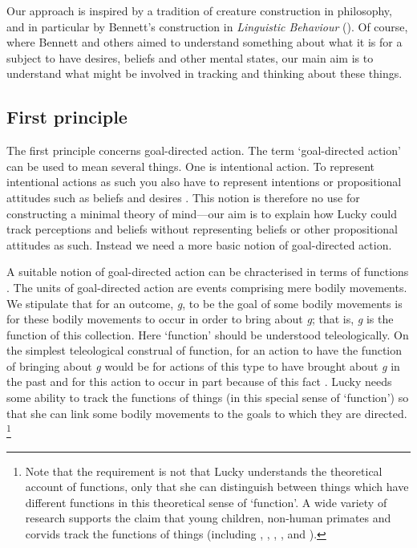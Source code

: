 \documentclass[12pt,\papersize]{extarticle}
\begin{document}
Our approach is inspired by a tradition of creature construction in philosophy, and in particular by Bennett’s construction in \textit{Linguistic Behaviour} (\citeyear{Bennett:1976rg}).  Of course, where Bennett and others aimed to understand something about what it is for a subject to have desires, beliefs and other mental states, our main aim is to understand what might be involved in tracking and thinking about these things.

\subsection{First principle}

The first principle concerns goal-directed action.
The term ‘goal-directed action’ can be used to mean several things.  One is intentional action.  To represent intentional actions as such you also have to represent intentions or  propositional attitudes such as beliefs and desires \citep[]{en_18}. 
This notion is therefore no use for constructing a minimal theory of mind---our aim is to explain how Lucky could  track perceptions and beliefs without representing beliefs or other propositional attitudes as such.
Instead we need a more basic notion of goal-directed action.  

A suitable notion of goal-directed action can be chracterised in terms of functions \citep{Taylor:1964tr,Dretske:1988sq}.
The units of goal-directed action are events comprising mere bodily movements.  
We stipulate that for an outcome, \textit{g}, to be the goal of some bodily movements is for these bodily movements to occur in order to bring about \textit{g}; that is, \textit{g} is the function of this collection.  Here ‘function’ should be understood teleologically.  On the simplest teleological construal of function, for an action to have the function of bringing about \textit{g} would be for actions of this type to have brought about \textit{g} in the past and for this action to occur in part because of this fact \citep[see further][]{en_144, en_141, en_162, en_139, en_161}.  Lucky needs some ability to track the functions of things (in this special sense of ‘function’) so that she can link some bodily movements to the goals to which they are directed.%
\footnote{
Note that the requirement is not that Lucky understands the theoretical account of functions, only that she can distinguish between things which have different functions in this theoretical sense of ‘function’.  A wide variety of research supports the claim that young children, non-human primates and corvids track the functions of things (including 
	\citealp{en_1086},
	\citealp{en_1318},
	\citealp{en_1431},
	\citealp{en_1447},
	\citealp{en_1325} and
	\citealp{en_1708}%
).
}
\end{document}
